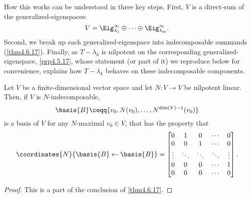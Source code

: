 How this works can be understood in three key steps.  First, $V$ is a direct-sum of the generalized-eigenspaces:
\begin{equation}
	V=\Eig _{\lambda _1}^{\infty}\oplus \cdots \oplus \Eig _{\lambda _m}^{\infty}.
\end{equation}
Second, we break up each generalized-eigenspace into indecomposable summands (\cref{thm4.6.17}).  Finally, as $T-\lambda _k$ is nilpotent on the corresponding generalized-eigenspace, \cref{prp4.5.17}, whose statement (or part of it) we reproduce below for convenience, explains how $T-\lambda _k$ behaves on these indecomposable components.
\begin{thm}{}{}
	Let $V$ be a finite-dimensional vector space and let $N\colon V\rightarrow V$ be nilpotent linear.  Then, if $V$ is $N$-indecomposable,
	\begin{equation}
		\basis{B}\ceqq \{ v_0,N(v_0),\ldots ,N^{\dim (V)-1}(v_0)\}
	\end{equation}
	is a basis of $V$ for any $N$-maximal $v_0\in V$, that has the property that
	\begin{equation}
		\coordinates{N}{\basis{B}\leftarrow \basis{B}}=\begin{bmatrix}0 & 1 & 0 & \cdots & 0 \\ 0 & 0 & 1 & \cdots & 0 \\ \vdots &\ddots & \ddots & \ddots & \vdots \\ 0 & 0 & 0 & \cdots & 1 \\ 0 & 0 & 0 & \cdots & 0\end{bmatrix}.
	\end{equation}
	\begin{proof}
		This is a part of the conclusion of \cref{thm4.6.17}.
	\end{proof}
\end{thm}

